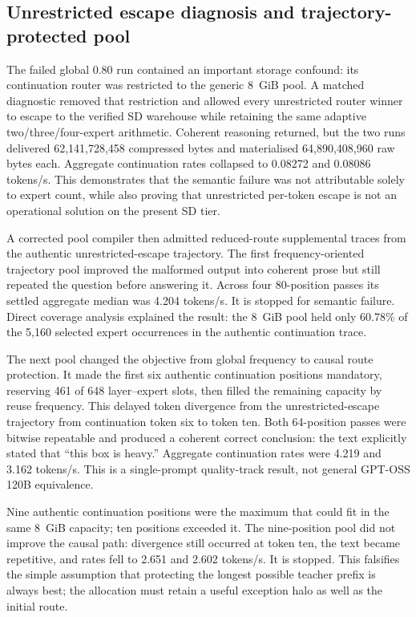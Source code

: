 \subsection{Unrestricted escape diagnosis and trajectory-protected pool}

The failed global 0.80 run contained an important storage confound: its
continuation router was restricted to the generic 8~GiB pool.  A matched
diagnostic removed that restriction and allowed every unrestricted router
winner to escape to the verified SD warehouse while retaining the same
adaptive two/three/four-expert arithmetic.  Coherent reasoning returned, but
the two runs delivered 62,141,728,458 compressed bytes and materialised
64,890,408,960 raw bytes each.  Aggregate continuation rates collapsed to
0.08272 and 0.08086 tokens/s.  This demonstrates that the semantic failure was
not attributable solely to expert count, while also proving that unrestricted
per-token escape is not an operational solution on the present SD tier.

A corrected pool compiler then admitted reduced-route supplemental traces from
the authentic unrestricted-escape trajectory.  The first frequency-oriented
trajectory pool improved the malformed output into coherent prose but still
repeated the question before answering it.  Across four 80-position passes its
settled aggregate median was 4.204 tokens/s.  It is stopped for semantic
failure.  Direct coverage analysis explained the result: the 8~GiB pool held
only 60.78\% of the 5,160 selected expert occurrences in the authentic
continuation trace.

The next pool changed the objective from global frequency to causal route
protection.  It made the first six authentic continuation positions mandatory,
reserving 461 of 648 layer--expert slots, then filled the remaining capacity by
reuse frequency.  This delayed token divergence from the unrestricted-escape
trajectory from continuation token six to token ten.  Both 64-position passes
were bitwise repeatable and produced a coherent correct conclusion: the text
explicitly stated that ``this box is heavy.''  Aggregate continuation rates
were 4.219 and 3.162 tokens/s.  This is a single-prompt quality-track result,
not general GPT-OSS 120B equivalence.

Nine authentic continuation positions were the maximum that could fit in the
same 8~GiB capacity; ten positions exceeded it.  The nine-position pool did
not improve the causal path: divergence still occurred at token ten, the text
became repetitive, and rates fell to 2.651 and 2.602 tokens/s.  It is stopped.
This falsifies the simple assumption that protecting the longest possible
teacher prefix is always best; the allocation must retain a useful exception
halo as well as the initial route.


